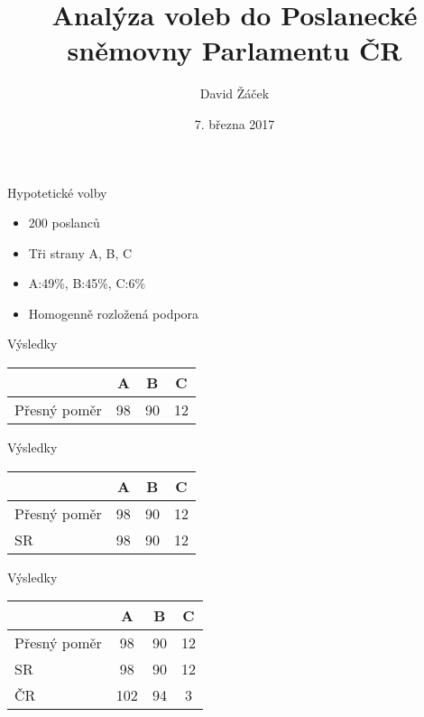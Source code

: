 \documentclass[17pt]{beamer}
\author{David Žáček}
\title[Volby do PSP ČR]{Analýza voleb do Poslanecké sněmovny Parlamentu ČR}
\institute{8.M}
\date{7. března 2017}
\begin{document}
\begin{frame}
\titlepage
\end{frame}


\begin{frame}{Hypotetické volby}
\begin{itemize}
\item 200 poslanců
\item Tři strany A, B, C
\item A:49\%, B:45\%, C:6\%
\item Homogenně rozložená podpora
\end{itemize}
\end{frame}

\begin{frame}{Výsledky}
\begin{center}
\begin{tabular}{|l|c|c|c|} \hline
  & A & B & C \\ \hline 
Přesný poměr & 98 & 90 & 12\\ \hline
\end{tabular}
\end{center} 
\end{frame}

\begin{frame}{Výsledky}
\begin{center}
\begin{tabular}{|l|c|c|c|} \hline
  & A & B & C \\ \hline 
Přesný poměr & 98 & 90 & 12\\ \hline
SR & 98 & 90 & 12\\ \hline
\end{tabular}
\end{center} 
\end{frame}

\begin{frame}{Výsledky}
\begin{center}
\begin{tabular}{|l|c|c|c|} \hline
  & A & B & C \\ \hline 
Přesný poměr & 98 & 90 & 12\\ \hline
SR & 98 & 90 & 12\\ \hline
ČR & 102 & 94 & 3\\ \hline
\end{tabular}
\end{center} 
\end{frame}
\end{document}
